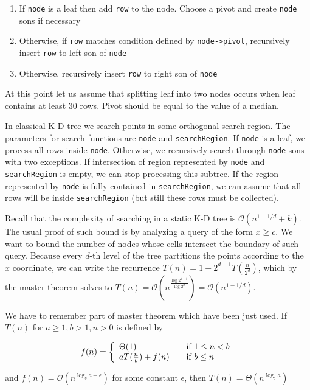 \documentclass[10pt,a4paper]{article}
\newcommand{\Oh}{\mathcal{O}}
\begin{document}
\begin{enumerate}
\item If \verb|node| is a leaf then add \verb|row| to the node. Choose a pivot and create \verb|node| sons if necessary
\item Otherwise, if \verb|row| matches condition defined by \verb|node->pivot|, recursively insert \verb|row| to left son of \verb|node|
\item Otherwise, recursively insert \verb|row| to right son of \verb|node|
\end{enumerate}

At this point let us assume that splitting leaf into two nodes occurs when leaf contains at least 30 rows. Pivot should be equal to the value of a median.

In classical K-D tree we search points in some orthogonal search region. The parameters for search functions are \verb|node| and \verb|searchRegion|. If \verb|node| is a leaf, we process all rows inside \verb|node|. Otherwise, we recursively search through \verb|node| sons with two exceptions. If intersection of region represented by \verb|node| and \verb|searchRegion| is empty, we can stop processing this subtree. If the region represented by \verb|node| is fully contained in \verb|searchRegion|, we can assume that all rows will be inside \verb|searchRegion| (but still these rows must be collected).

Recall that the complexity of searching in a static K-D tree is $\Oh(n^{1-1/d} + k)$. The usual proof of such bound is by analyzing a query of the form $x \geq c$. We want to bound the number of nodes whose cells intersect the boundary of such query. Because every $d$-th level of the tree partitions the points according to the $x$ coordinate, we can write the recurrence $T(n)=1+2^{d-1}T(\frac{n}{2^{d}})$, which by the master theorem solves to $T(n)=\Oh(n^{\frac{\log 2^{d-1}}{\log 2^{d}}})=\Oh(n^{1-1/d})$. 

We have to remember part of master theorem which have been just used. If $T(n)$ for $a \geq 1, b > 1, n > 0$ is defined by


\[
  f(n) = \left\{ 
  \begin{array}{l l}
    \Theta(1) & \quad \text{if $1 \leq n < b$}\\
    a T(\frac{n}{b}) + f(n) & \quad \text{if $b \leq n$ }\\
  \end{array} \right.
\]

and $f(n)=\Oh(n^{{\log_{b}{a}} - \epsilon})$ for some constant $\epsilon$, then $T(n) = \Theta(n^{\log_{b}{a}})$
\bigskip
\end{document}
